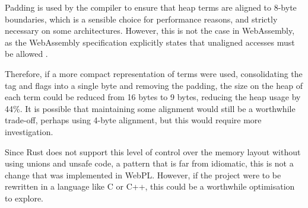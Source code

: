Padding is used by the compiler to ensure that heap terms are aligned to 8-byte boundaries, which is a sensible choice for performance reasons, and strictly necessary on some architectures. However, this is not the case in WebAssembly, as the WebAssembly specification explicitly states that unaligned accesses must be allowed \cite{rossbergWebAssemblyCoreSpecification2022}.

Therefore, if a more compact representation of terms were used, consolidating the tag and flags into a single byte and removing the padding, the size on the heap of each term could be reduced from 16 bytes to 9 bytes, reducing the heap usage by 44\%. It is possible that maintaining some alignment would still be a worthwhile trade-off, perhaps using 4-byte alignment, but this would require more investigation.

Since Rust does not support this level of control over the memory layout without using unions and unsafe code, a pattern that is far from idiomatic, this is not a change that was implemented in WebPL. However, if the project were to be rewritten in a language like C or C++, this could be a worthwhile optimisation to explore.